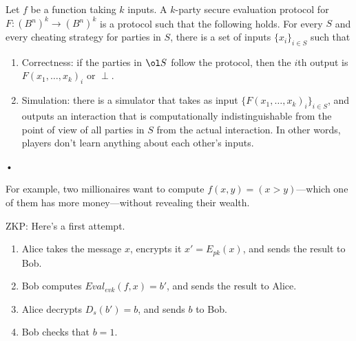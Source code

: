 \begin{df}
Let $f$ be a function taking $k$ inputs. A $k$-party secure evaluation protocol for $F:(B^n)^k\to (B^n)^k$ is a protocol such that the following holds. For every $S$ and every cheating strategy for parties in $S$, there is a set of inputs $\{x_i\}_{i\in S}$ such that 
\begin{enumerate}
\item Correctness: if the parties in $\ol S$ follow the protocol, then the $i$th output is $F(x_1,\ldots, x_k)_i$ or $\perp$.
\item
Simulation: there is a simulator that takes as input $\{F(x_1,\ldots, x_k)_i\}_{i\in S}$, and outputs an interaction that is computationally indistinguishable from the point of view of all parties in $S$ from the actual interaction. In other words, players don't learn anything about each other's inputs.
\end{enumerate}•
\end{df}
For example, two millionaires want to compute $f(x,y)=(x>y)$---which one of them has more money---without revealing their wealth.

ZKP: Here's a first attempt.
\begin{enumerate}
\item
Alice takes the message $x$, encrypts it $x'=E_{pk}(x)$, and sends the result to Bob.
\item
Bob computes $Eval_{evk}(f,x)=b'$, and sends the result to Alice.
\item
Alice decrypts $D_s(b')=b$, and sends $b$ to Bob.
\item
Bob checks that $b=1$.
\end{enumerate}


